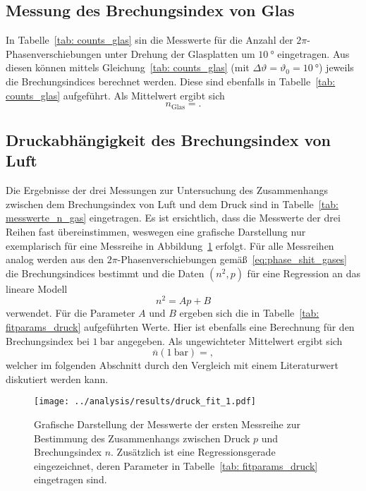 \subsection{Messung des Brechungsindex von Glas}
In Tabelle~\ref{tab: counts_glas} sin die Messwerte für die Anzahl der $2\pi$-Phasenverschiebungen unter Drehung der Glasplatten um $\SI{10}{\degree}$
eingetragen. Aus diesen können mittels Gleichung~\eqref{tab: counts_glas} 
(mit $\Delta\vartheta = \vartheta_0 = \SI{10}{\degree}$) jeweils die Brechungsindices berechnet werden. Diese sind ebenfalls in Tabelle~\ref{tab: counts_glas}  
aufgeführt. Als Mittelwert ergibt sich 
\begin{equation}
    n_{\text{Glas}} = .
\end{equation}



\subsection{Druckabhängigkeit des Brechungsindex von Luft}
Die Ergebnisse der drei Messungen zur Untersuchung des Zusammenhangs zwischen dem Brechungsindex von Luft und dem Druck sind in 
Tabelle~\ref{tab: messwerte_n_gas} eingetragen. Es ist ersichtlich, dass die Messwerte der drei Reihen fast übereinstimmen, weswegen eine grafische
Darstellung nur exemplarisch für eine Messreihe in Abbildung~\ref{fig: fit_druck} erfolgt. Für alle Messreihen analog werden aus 
den $2\pi$-Phasenverschiebungen gemäß~\eqref{eq:phase_shit_gases} die Brechungsindices bestimmt und die Daten $(n^2, p)$ für eine Regression an 
das lineare Modell
\begin{equation}
    n^2 = A p + B
\end{equation}
verwendet. Für die Parameter $A$ und $B$ ergeben sich die in Tabelle~\ref{tab: fitparams_druck} aufgeführten Werte. Hier ist ebenfalls eine 
Berechnung für den Brechungsindex bei $\SI{1}{\bar}$ angegeben. Als ungewichteter Mittelwert ergibt sich
\begin{equation}
    \overline{n}\left(\SI{1}{\bar} \right) = ,
\end{equation}
welcher im folgenden Abschnitt durch den Vergleich mit einem Literaturwert
diskutiert werden kann. 

\begin{figure}
    \centering
    \texttt{[image: ../analysis/results/druck\_fit\_1.pdf]}
    \caption{Grafische Darstellung der Messwerte der ersten Messreihe zur Bestimmung des Zusammenhangs zwischen 
    Druck $p$ und Brechungsindex $n$. Zusätzlich ist eine Regressionsgerade eingezeichnet, deren Parameter in 
    Tabelle~\ref{tab: fitparams_druck} eingetragen sind.}
    \label{fig: fit_druck}
\end{figure}











